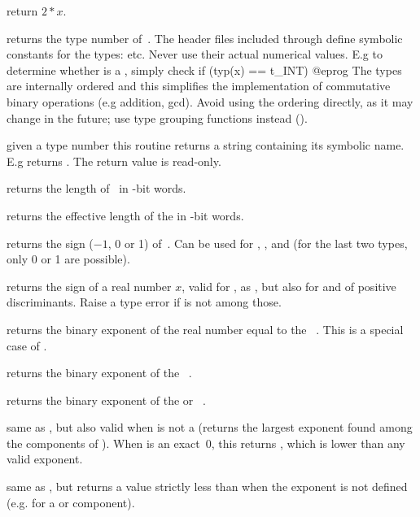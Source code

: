  return $2*x$.


 returns the type number of~. The header files
included through  define symbolic constants for the 
types:  etc. Never use their actual numerical values. E.g to determine
whether  is a , simply check
\bprog
  if (typ(x) == t_INT) { }
@eprog\noindent
The types are internally ordered and this simplifies the implementation of
commutative binary operations (e.g addition, gcd). Avoid using the ordering
directly, as it may change in the future; use type grouping functions
instead ().

 given a type number  this routine
returns a string containing its symbolic name. E.g 
returns . The return value is read-only.

 returns the length of~ in \B-bit words.

 returns the effective length of the 
 in \B-bit words.

 returns the sign ($-1$, 0 or 1) of~. Can be
used for , ,  and  (for the last two
types, only 0 or 1 are possible).

 returns the sign of a real number $x$,
valid for ,  as , but also for 
and  of positive discriminants. Raise a type error if 
is not among those.

 returns the binary exponent of the real number equal
to the ~. This is a special case of .

 returns the binary exponent of the
~.

 returns the binary exponent of the 
or ~.

 same as , but also valid when 
is not a  (returns the largest exponent found among the components
of ). When  is an exact~0, this returns
\hbox{}, which is lower than any valid exponent.

 same as , but returns a value
strictly less than \hbox{} when the exponent is not defined
(e.g. for a  or  component).

